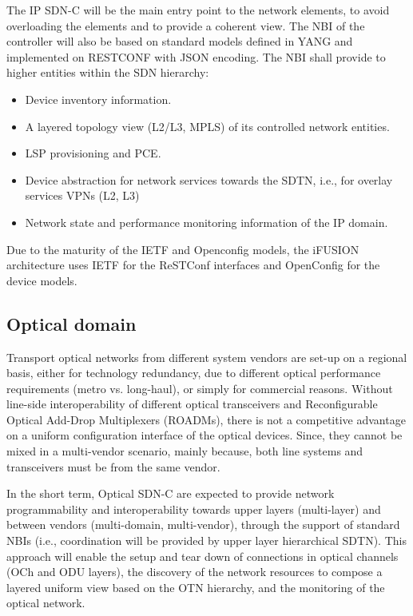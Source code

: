 \documentclass[a4paper,fleqn]{cas-dc}
\begin{document}
The IP SDN-C will be the main entry point to the network elements, to avoid overloading the elements and to provide a coherent view. The NBI of the controller will also be based on standard models defined in YANG and implemented on RESTCONF with JSON encoding. The NBI shall provide to higher entities within the SDN hierarchy:
\begin{itemize}
\item Device inventory information.
\item A layered topology view (L2/L3, MPLS) of its controlled network entities.
\item LSP provisioning and PCE.
\item Device abstraction for network services towards the SDTN, i.e., for overlay services VPNs (L2, L3)
\item Network state and performance monitoring information of the IP domain. 
\end{itemize}

Due to the maturity of the IETF and Openconfig models, the i\uppercase{FUSION} architecture uses IETF for the ReSTConf interfaces and OpenConfig for the device models.

\subsection{Optical domain}
\label{section:dwdm}
Transport optical networks from different system vendors are set-up on a regional basis, either for technology redundancy, due to different optical performance requirements (metro vs. long-haul), or simply for commercial reasons. 
Without line-side interoperability of different optical transceivers and Reconfigurable Optical Add-Drop Multiplexers (ROADMs), there is not a competitive advantage on a uniform configuration interface of the optical devices. Since, they cannot be mixed in a multi-vendor scenario, mainly because, both line systems and transceivers must be from the same vendor.

In the short term, Optical SDN-C are expected to provide network programmability and interoperability towards upper layers (multi-layer) and between vendors (multi-domain, multi-vendor), through the support of standard NBIs (i.e., coordination will be provided by upper layer hierarchical SDTN). This approach will enable the setup and tear down of connections in optical channels (OCh and ODU layers), the discovery of the network resources to compose a layered uniform view based on the OTN hierarchy, and the monitoring of the optical network.
\end{document}

